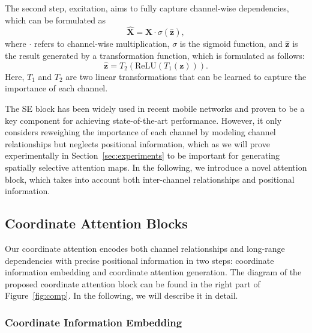 \documentclass[final]{cvpr}
\begin{document}
The second step, excitation, aims to fully capture channel-wise dependencies, which can be formulated as 
\begin{equation}
    \hat{\mathbf{X}} = \mathbf{X} \cdot \sigma(\hat{\mathbf{z}}),
\end{equation}
where $\cdot$ refers to channel-wise multiplication, $\sigma$ is the sigmoid function, and $\hat{\mathbf{z}}$ is the result generated by a transformation function, which is formulated as follows:
\begin{equation}
    \hat{\mathbf{z}} = T_2(\text{ReLU}(T_1(\mathbf{z}))).
\end{equation}
Here, $T_1$ and $T_2$ are two linear transformations that can be learned to capture the importance of each channel.


The SE block has been widely used in recent mobile networks \cite{hu2018squeeze,chen2018searching,tan2019efficientnet}
and proven to be a key component for
achieving state-of-the-art performance.
%
However, it only considers reweighing the importance of each channel by modeling channel relationships but neglects positional information, which as we will prove experimentally in Section~\ref{sec:experiments} to be important for generating spatially selective attention maps.
%
In the following, we introduce a novel attention block, which takes into account both inter-channel
relationships and positional information.

\subsection{Coordinate Attention Blocks}

%

%
Our coordinate attention encodes both channel relationships and long-range dependencies with precise positional information in two steps:
coordinate information embedding and coordinate attention generation.
%
The diagram of the proposed coordinate attention block can be found in the right part of Figure~\ref{fig:comp}.
%
In the following, we will describe it in detail.

\subsubsection{Coordinate Information Embedding}

\end{document}
